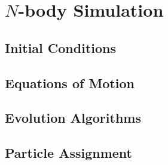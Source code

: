 \chapter{$N$-body Simulation}

\section{Initial Conditions}

\section{Equations of Motion}


\section{Evolution Algorithms}


\section{Particle Assignment}
